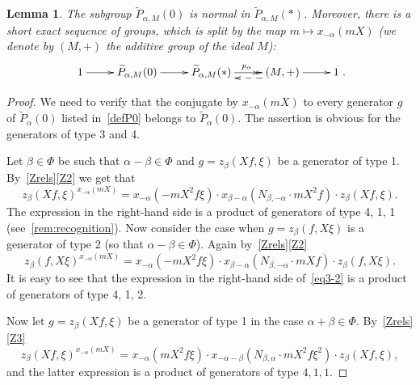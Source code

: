 \documentclass[oneside, 8pt]{amsart}
\newtheorem{lemma}{Lemma}
\theoremstyle{remark}
\theoremstyle{definition}
\numberwithin{lemma}{section}
\numberwithin{prop}{section}
\numberwithin{corollary}{section}
\numberwithin{externaltheorem}{section}
\numberwithin{equation}{section}
\begin{document}
\begin{lemma}\label{P0_normal} The subgroup $\widetilde{P}_{\alpha, M}(0)$ is normal in $\widetilde{P}_{\alpha, M}(*)$. Moreover, there is a short exact sequence of groups, which is split by the map $m \mapsto x_{-\alpha}(mX)$ (we denote by $(M, +)$ the additive group of the ideal $M$):
\[\xymatrix{1 \ar[r] & \widetilde{P}_{\alpha,M}(0) \ar[r] & \widetilde{P}_{\alpha,M}(*) \ar@{->>}[r]^{p_\alpha} & (M, +) \ar@<5pt>@{-->}[l] \ar[r] & 1}.\] \end{lemma}
\begin{proof} We need to verify that the conjugate by $x_{-\alpha}(mX)$ to every generator $g$ of $\widetilde{P}_\alpha(0)$ listed in~\cref{defP0} belongs to $\widetilde{P}_\alpha(0)$.
The assertion is obvious for the generators of type 3 and 4.

Let $\beta\in\Phi$ be such that $\alpha - \beta \in \Phi$ and $g = z_\beta(Xf, \xi)$ be a generator of type 1. By~\cref{Zrels}\eqref{Z2} we get that \begin{equation} z_{\beta}(Xf, \xi) ^ {x_{-\alpha}(mX)} =  x_{-\alpha} (- mX^2f\xi) \cdot x_{\beta-\alpha} (N_{\beta, -\alpha}\cdot mX^2f) \cdot z_{\beta}(Xf, \xi). \label{eq3-1} \end{equation}
The expression in the right-hand side is a product of generators of type 4, 1, 1 (see~\cref{rem:recognition}).
Now consider the case when $g = z_\beta(f, X\xi)$ is a generator of type $2$ (so that $\alpha-\beta\in\Phi$). Again by~\cref{Zrels}\eqref{Z2}
\begin{equation}
z_{\beta}(f, X\xi) ^ {x_{-\alpha}(mX)} =  x_{-\alpha} (- mX^2f\xi ) \cdot x_{\beta-\alpha} (N_{\beta, -\alpha}\cdot mXf) \cdot z_{\beta}(f, X\xi). \label{eq3-2} \end{equation}
It is easy to see that the expression in the right-hand side of~\eqref{eq3-2} is a product of generators of type 4, 1, 2.  

Now let $g = z_{\beta}(Xf, \xi)$ be a generator of type 1 in the case $\alpha + \beta \in \Phi$. By~\cref{Zrels}\eqref{Z3}
\begin{equation} \label{eq3-3} z_{\beta}(Xf, \xi) ^ {x_{-\alpha}(mX)} = x_{-\alpha} (mX^2f\xi ) \cdot x_{-\alpha-\beta} (N_{\beta,\alpha}\cdot mX^2f\xi^2) \cdot z_{\beta}(Xf, \xi), \end{equation}
and the latter expression is a product of generators of type $4, 1, 1$.


\end{proof}
\end{document}
